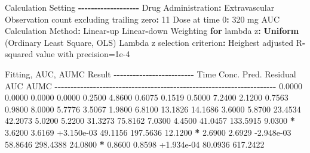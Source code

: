 \documentclass[
  10pt,
]{krantz}
\makeatletter
\newenvironment{Shaded}{\begin{snugshade}}{\end{snugshade}}
\newcommand{\ControlFlowTok}[1]{\textcolor[rgb]{0.13,0.29,0.53}{\textbf{#1}}}
\newcommand{\DecValTok}[1]{\textcolor[rgb]{0.00,0.00,0.81}{#1}}
\newcommand{\FloatTok}[1]{\textcolor[rgb]{0.00,0.00,0.81}{#1}}
\newcommand{\KeywordTok}[1]{\textcolor[rgb]{0.13,0.29,0.53}{\textbf{#1}}}
\newcommand{\NormalTok}[1]{#1}
\newcommand{\OperatorTok}[1]{\textcolor[rgb]{0.81,0.36,0.00}{\textbf{#1}}}
\newcommand{\StringTok}[1]{\textcolor[rgb]{0.31,0.60,0.02}{#1}}
\newenvironment{kframe}{%
\medskip{}
\setlength{\fboxsep}{.8em}
 \def\at@end@of@kframe{}%
 \ifinner\ifhmode%
  \def\at@end@of@kframe{\end{minipage}}%
  \begin{minipage}{\columnwidth}%
 \fi\fi%
 \def\FrameCommand##1{\hskip\@totalleftmargin \hskip-\fboxsep
 \colorbox{shadecolor}{##1}\hskip-\fboxsep
     \hskip-\linewidth \hskip-\@totalleftmargin \hskip\columnwidth}%
 \MakeFramed {\advance\hsize-\width
   \@totalleftmargin\z@ \linewidth\hsize
   \@setminipage}}%
 {\par\unskip\endMakeFramed%
 \at@end@of@kframe}
\renewenvironment{Shaded}{\begin{kframe}}{\end{kframe}}
\makeatother
\begin{document}
\begin{Shaded}
\begin{Highlighting}[]
\NormalTok{Calculation Setting}
\OperatorTok{{-}{-}{-}{-}{-}{-}{-}{-}{-}{-}{-}{-}{-}{-}{-}{-}{-}{-}{-}}
\NormalTok{Drug Administration}\OperatorTok{:}\StringTok{ }\NormalTok{Extravascular}
\NormalTok{Observation count excluding trailing zero}\OperatorTok{:}\StringTok{ }\DecValTok{11}
\NormalTok{Dose at time }\DecValTok{0}\OperatorTok{:}\StringTok{ }\DecValTok{320}\NormalTok{ mg}
\NormalTok{AUC Calculation Method}\OperatorTok{:}\StringTok{ }\NormalTok{Linear}\OperatorTok{{-}}\NormalTok{up Linear}\OperatorTok{{-}}\NormalTok{down}
\NormalTok{Weighting }\ControlFlowTok{for}\NormalTok{ lambda z}\OperatorTok{:}\StringTok{ }\KeywordTok{Uniform}\NormalTok{ (Ordinary Least Square, OLS)}
\NormalTok{Lambda z selection criterion}\OperatorTok{:}\StringTok{ }\NormalTok{Heighest adjusted R}\OperatorTok{{-}}\NormalTok{squared value with precision=}\FloatTok{1e{-}4}


\NormalTok{Fitting, AUC, AUMC Result}
\OperatorTok{{-}{-}{-}{-}{-}{-}{-}{-}{-}{-}{-}{-}{-}{-}{-}{-}{-}{-}{-}{-}{-}{-}{-}{-}{-}}
\StringTok{      }\NormalTok{Time         Conc.      Pred.   Residual       AUC       AUMC}
\OperatorTok{{-}{-}{-}{-}{-}{-}{-}{-}{-}{-}{-}{-}{-}{-}{-}{-}{-}{-}{-}{-}{-}{-}{-}{-}{-}{-}{-}{-}{-}{-}{-}{-}{-}{-}{-}{-}{-}{-}{-}{-}{-}{-}{-}{-}{-}{-}{-}{-}{-}{-}{-}{-}{-}{-}{-}{-}{-}{-}{-}{-}{-}{-}{-}{-}{-}{-}{-}{-}{-}}
\StringTok{     }\FloatTok{0.0000}       \FloatTok{0.0000}                           \FloatTok{0.0000}     \FloatTok{0.0000}
     \FloatTok{0.2500}       \FloatTok{4.8600}                           \FloatTok{0.6075}     \FloatTok{0.1519}
     \FloatTok{0.5000}       \FloatTok{7.2400}                           \FloatTok{2.1200}     \FloatTok{0.7563}
     \FloatTok{0.9800}       \FloatTok{8.0000}                           \FloatTok{5.7776}     \FloatTok{3.5067}
     \FloatTok{1.9800}       \FloatTok{6.8100}                          \FloatTok{13.1826}    \FloatTok{14.1686}
     \FloatTok{3.6000}       \FloatTok{5.8700}                          \FloatTok{23.4534}    \FloatTok{42.2073}
     \FloatTok{5.0200}       \FloatTok{5.2200}                          \FloatTok{31.3273}    \FloatTok{75.8162}
     \FloatTok{7.0300}       \FloatTok{4.4500}                          \FloatTok{41.0457}   \FloatTok{133.5915}
     \FloatTok{9.0300} \OperatorTok{*}\StringTok{     }\FloatTok{3.6200}     \FloatTok{3.6169} \FloatTok{+3.150e{-}03}    \FloatTok{49.1156}   \FloatTok{197.5636}
    \FloatTok{12.1200} \OperatorTok{*}\StringTok{     }\FloatTok{2.6900}     \FloatTok{2.6929} \FloatTok{{-}2.948e{-}03}    \FloatTok{58.8646}   \FloatTok{298.4388}
    \FloatTok{24.0800} \OperatorTok{*}\StringTok{     }\FloatTok{0.8600}     \FloatTok{0.8598} \FloatTok{+1.934e{-}04}    \FloatTok{80.0936}   \FloatTok{617.2422}


\end{Highlighting}
\end{Shaded}
\end{document}
